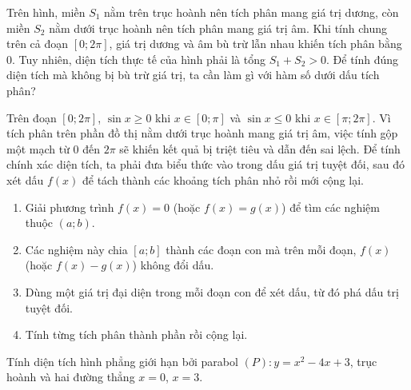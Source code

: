 \begin{hopgoiy}
Trên hình, miền $S_1$ nằm trên trục hoành nên tích phân mang giá trị dương, còn miền $S_2$ nằm dưới trục hoành nên tích phân mang giá trị âm. Khi tính chung trên cả đoạn $[0; 2\pi]$, giá trị dương và âm bù trừ lẫn nhau khiến tích phân bằng $0$. Tuy nhiên, diện tích thực tế của hình phải là tổng $S_1+S_2>0$. Để tính đúng diện tích mà không bị bù trừ giá trị, ta cần làm gì với hàm số dưới dấu tích phân?
\end{hopgoiy}

\begin{hopyduong}
Trên đoạn $[0;2\pi]$, $\sin x \ge 0$ khi $x \in [0;\pi]$ và $\sin x \le 0$ khi $x \in [\pi;2\pi]$. Vì tích phân trên phần đồ thị nằm dưới trục hoành mang giá trị âm, việc tính gộp một mạch từ $0$ đến $2\pi$ sẽ khiến kết quả bị triệt tiêu và dẫn đến sai lệch. Để tính chính xác diện tích, ta phải đưa biểu thức vào trong dấu giá trị tuyệt đối, sau đó xét dấu $f(x)$ để tách thành các khoảng tích phân nhỏ rồi mới cộng lại.
\end{hopyduong}
\newpage
\begin{hopphuongphap}
\begin{enumerate}[leftmargin=1cm]
  \item Giải phương trình $f(x)=0$ (hoặc $f(x)=g(x)$) để tìm các nghiệm thuộc $(a;b)$.
  \item Các nghiệm này chia $[a;b]$ thành các đoạn con mà trên mỗi đoạn, $f(x)$ (hoặc $f(x)-g(x)$) không đổi dấu.
  \item Dùng một giá trị đại diện trong mỗi đoạn con để xét dấu, từ đó phá dấu trị tuyệt đối.
  \item Tính từng tích phân thành phần rồi cộng lại.
\end{enumerate}
\end{hopphuongphap}

\begin{hopvidu}
Tính diện tích hình phẳng giới hạn bởi parabol $(P): y=x^2-4x+3$, trục hoành và hai đường thẳng $x=0$, $x=3$.
\end{hopvidu}

